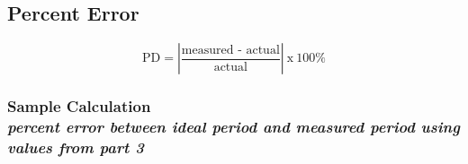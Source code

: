 %
%
%

\subsection{Percent Error}
\vspace{0.5cm}
\begin{equation}
	\text{PD}	= \left| \frac{\text{measured - actual}}{\text{actual}} \right|\: \text{x}\: 100\%
	\label{eq:perror}
\end{equation}

\subsubsection{Sample Calculation \\ {\normalfont \small\textit{percent error between ideal period and measured period using values from part 3}}}

